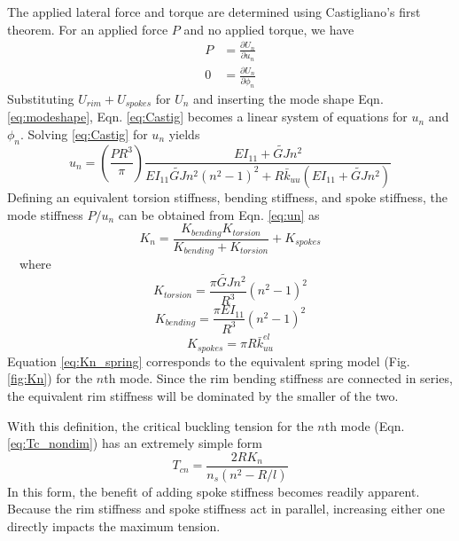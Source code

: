 \documentclass{bmd2016p}
\begin{document}
The applied lateral force and torque are determined using Castigliano's first theorem. For an applied force $P$ and no applied torque, we have
	\begin{equation}\label{eq:Castig}
	\begin{split}
	P &= \frac{\partial U_n}{\partial u_n}\\%
	0 &= \frac{\partial U_n}{\partial \phi_n}%
	\end{split}
	\end{equation}
Substituting $U_{rim} + U_{spokes}$ for $U_n$ and inserting the mode shape Eqn. \ref{eq:modeshape}, Eqn. \ref{eq:Castig} becomes a linear system of equations for $u_n$ and $\phi_n$. Solving \ref{eq:Castig} for $u_n$ yields
	\begin{equation}\label{eq:un}
	u_n = \left(\frac{PR^3}{\pi}\right) \frac{EI_{11}+\widetilde{GJ}n^2}{EI_{11}\widetilde{GJ}n^2(n^2-1)^2 + R\bar{k}_{uu}(EI_{11}+\widetilde{GJ}n^2)}
	\end{equation}
Defining an equivalent torsion stiffness, bending stiffness, and spoke stiffness, the mode stiffness $P/u_n$ can be obtained from Eqn. \ref{eq:un} as
	\begin{equation}\label{eq:Kn_spring}
	K_n = \frac{K_{bending}K_{torsion}}{K_{bending}+K_{torsion}} + K_{spokes}
	\end{equation}
\,\,\,\, where
	\begin{equation}\label{eq:Ktorsion}
	K_{torsion} = \frac{\pi\widetilde{GJ}n^2}{R^3}(n^2-1)^2
	\end{equation}
	\begin{equation}\label{eq:Kbending}
	K_{bending} = \frac{\pi EI_{11}}{R^3}(n^2-1)^2
	\end{equation}
	\begin{equation}\label{eq:Kspokes}
	K_{spokes} = \pi R \bar{k}_{uu}^{el}
	\end{equation}
Equation \ref{eq:Kn_spring} corresponds to the equivalent spring model (Fig. \ref{fig:Kn}) for the $n$th mode. Since the rim bending stiffness are connected in series, the equivalent rim stiffness will be dominated by the smaller of the two.

With this definition, the critical buckling tension for the $n$th mode (Eqn. \ref{eq:Tc_nondim}) has an extremely simple form
	\begin{equation}\label{eq:Tc_Kn}
	T_{cn} = \frac{2RK_n}{n_s(n^2 - R/l)}
	\end{equation}
In this form, the benefit of adding spoke stiffness becomes readily apparent. Because the rim stiffness and spoke stiffness act in parallel, increasing either one directly impacts the maximum tension.
\end{document}
